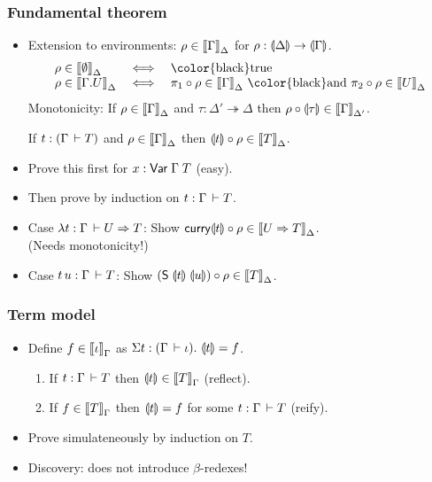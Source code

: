 \documentclass[t,fleqn,usenames,dvipsnames]{beamer}
\renewcommand{\Var}[2]{\tVar\;#1\;#2}
\newcommand{\mybox}[1]{\mbox{\color{black}#1}}
\renewcommand{\mand}{\ \mybox{and}\ }
\renewcommand{\mtrue}{\mybox{true}}
\newcommand{\ope}{\twoheadrightarrow}
\begin{document}
\begin{frame}%
  \frametitle{Fundamental theorem}
  \vspace{-3ex}
  \begin{itemize}
  \item Extension to environments: $\rho \in \mathopen{{[\kern-0.14em[}} \Gamma \mathclose{{]\kern-0.14em]}}_{\Delta}$ for
    $\rho : \llparenthesis\Delta\rrparenthesis \to \llparenthesis\Gamma\rrparenthesis$.
\[
\begin{array}{lll}
  \rho \in \Den \cempty \Delta & \iff & \mtrue \\
  \rho \in \Den {\Gamma.U} \Delta & \iff &
    \pi_1 \comp \rho \in \Den \Gamma \Delta \mand
    \pi_2 \comp \rho \in \Den U \Delta
\end{array}
\]
  Monotonicity: If $\rho \in \mathopen{{[\kern-0.14em[}} \Gamma \mathclose{{]\kern-0.14em]}}_{\Delta}$ and $\tau : \Delta'
  \ope \Delta$ then $\rho \circ \llparenthesis\tau\rrparenthesis \in \mathopen{{[\kern-0.14em[}} \Gamma \mathclose{{]\kern-0.14em]}}_{\Delta'}$.
\begin{theorem}
  If $t : (\Gamma \,\vdash T)$ and $\rho \in \mathopen{{[\kern-0.14em[}} \Gamma \mathclose{{]\kern-0.14em]}}_{\Delta}$ then
  $\llparenthesis t\rrparenthesis \circ \rho \in \mathopen{{[\kern-0.14em[}} T \mathclose{{]\kern-0.14em]}}_{\Delta}$.
\end{theorem}
  \item Prove this first for $x : \Var \Gamma T$ (easy).
  \item Then prove by induction on $t : \Gamma \,\vdash T$.
  \item Case $\lambda t : \Gamma \,\vdash U \Rightarrow T$:
    Show $\mathsf{curry} \llparenthesis t\rrparenthesis \circ \rho \in \mathopen{{[\kern-0.14em[}} U \Rightarrow T \mathclose{{]\kern-0.14em]}}_{\Delta}$. \\
    (Needs monotonicity!)
  \item Case $t\,u : \Gamma \,\vdash T$:
    Show $(\mathsf{S}\;\llparenthesis t\rrparenthesis \; \llparenthesis u\rrparenthesis) \circ \rho \in \mathopen{{[\kern-0.14em[}} T \mathclose{{]\kern-0.14em]}}_{\Delta}$.
  \end{itemize}
\end{frame}


\begin{frame}%
  \frametitle{Term model}
  \vspace{-3ex}
  \begin{itemize}
  \item Define $f \in \mathopen{{[\kern-0.14em[}} \iota \mathclose{{]\kern-0.14em]}}_{\Gamma}$ as $\Sigma t : (\Gamma \,\vdash
    \iota).\ \llparenthesis t\rrparenthesis = f$.
    \begin{theorem}
      \begin{enumerate}
      \item If $t : \Gamma \,\vdash T$ then $\llparenthesis t\rrparenthesis \in \mathopen{{[\kern-0.14em[}} T \mathclose{{]\kern-0.14em]}}_{\Gamma}$ (reflect).
      \item If $f \in \mathopen{{[\kern-0.14em[}} T \mathclose{{]\kern-0.14em]}}_{\Gamma}$ then $\llparenthesis t\rrparenthesis = f$ for some $t :
        \Gamma \,\vdash T$ (reify).
      \end{enumerate}
    \end{theorem}
  \item Prove simulateneously by induction on $T$.
  \item Discovery: does not introduce $\beta$-redexes!
  \end{itemize}
\end{frame}
\end{document}
